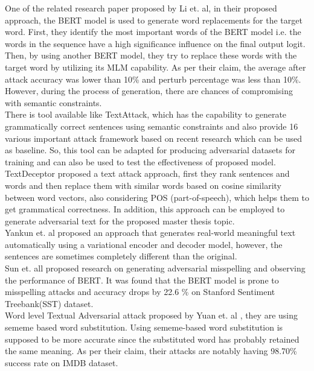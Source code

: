 \documentclass[%
	BCOR=8mm, %
	DIV=12, 
	toc=bibliography, %
	toc=listof, %
	oneside, %
	egregdoesnotlikesansseriftitles, %
	]{scrbook}
\begin{document}
One of the related research paper proposed by Li et$.$ al\cite{li_bert-attack_2020}, in their proposed approach, the BERT model is used to generate word replacements for the target word. First, they identify the most important words of the BERT model i.e. the words in the sequence have a high significance influence on the final output logit. Then, by using another BERT model, they try to replace these words with the target word by utilizing its MLM capability. As per their claim, the average after attack accuracy was lower than 10\% and perturb percentage was less than 10\%.   However, during the process of generation, there are chances of compromising with semantic constraints.\\
There is tool available like TextAttack, which has the capability to generate grammatically correct sentences using semantic constraints  and also provide 16 various important attack framework based on recent research which can be used as baseline. So, this tool can be adapted for producing adversarial datasets for training and can also be used to test the effectiveness of proposed model.\\
TextDeceptor \cite{saxena_textdecepter_2020} proposed a text attack approach, first they rank sentences and words and then replace them with similar words based on cosine similarity between word vectors, also considering POS (part-of-speech), which helps them to get grammatical correctness. In addition, this approach can be employed to generate adversarial text for the proposed master thesis topic.  \\
Yankun et$.$ al\cite{ren_generating_2020} proposed an approach that generates real-world meaningful text automatically using a variational encoder and decoder model, however, the sentences are sometimes completely different than the original.\\
Sun et$.$ all \cite{sun_adv-bert_2020} proposed research on generating adversarial misspelling and observing the performance of BERT. It was found that the BERT model is prone to misspelling attacks and accuracy drops by 22.6 \% on Stanford Sentiment Treebank(SST) dataset.\\
Word level Textual Adversarial attack proposed by Yuan et$.$ al \cite{zang_word-level_2019}, they are using sememe based word substitution. Using sememe-based word substitution is supposed to be more accurate since the substituted word has probably retained the same meaning. As per their claim, their attacks are notably having 98.70\% success rate on IMDB dataset. \\
\end{document}
